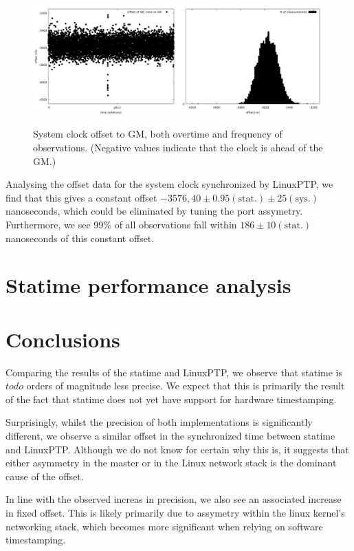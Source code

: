\documentclass{article}
\begin{document}
\begin{figure}[h]
\includegraphics[width=0.5\textwidth]{gm_ref_offset_overtime.pdf}\includegraphics[width=0.5\textwidth]{gm_ref_offset.pdf}
\caption{System clock offset to GM, both overtime and frequency of observations. (Negative values indicate that the clock is ahead of the GM.)}
\label{fig:ref_sys_offset}
\end{figure}

Analysing the offset data for the system clock synchronized by LinuxPTP, we find that this gives a constant offset $-3576,40\pm 0.95 (\text{stat.}) \pm 25(\text{sys.})$ nanoseconds, which could be eliminated by tuning the port assymetry. Furthermore, we see 99\% of all observations fall within $186 \pm 10 (\text{stat.})$ nanoseconds of this constant offset.

\section{Statime performance analysis}

\section{Conclusions}

Comparing the results of the statime and LinuxPTP, we observe that statime is $todo$ orders of magnitude less precise. We expect that this is primarily the result of the fact that statime does not yet have support for hardware timestamping.

Surprisingly, whilst the precision of both implementations is significantly different, we observe a similar offset in the synchronized time between statime and LinuxPTP. Although we do not know for certain why this is, it suggests that either asymmetry in the master or in the Linux network stack is the dominant cause of the offset.

In line with the observed increas in precision, we also see an associated increase in fixed offset. This is likely primarily due to assymetry within the linux kernel's networking stack, which becomes more significant when relying on software timestamping.
\end{document}
